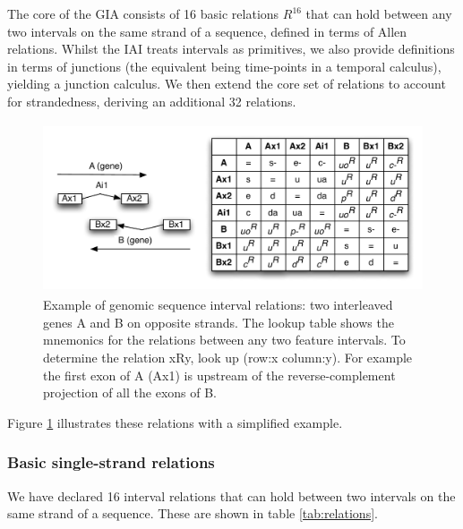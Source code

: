 \documentclass{article}
\begin{document}
The core of the GIA consists of 16 basic relations $R^{16}$ that can hold
between any two intervals on the same strand of a sequence, defined in
terms of Allen relations. Whilst the IAI treats intervals as
primitives, we also provide definitions in terms of junctions (the
equivalent being time-points in a temporal calculus), yielding a
junction calculus.  We then extend the core set of relations to
account for strandedness, deriving an additional 32 relations.

\begin{figure}
\center
\includegraphics[height=5cm]{relations-examples}
\caption{Example of genomic sequence interval relations: two
  interleaved genes A and B on opposite strands. The lookup table
  shows the mnemonics for the relations between any two feature
  intervals. To determine the relation xRy, look up (row:x
  column:y). For example the first exon of A (Ax1) is upstream of the
  reverse-complement projection of all the exons of B.}
\label{fig:relations-examples}
\end{figure}

Figure \ref{fig:relations-examples} illustrates these relations with a
simplified example.

\subsubsection{Basic single-strand relations}

We have declared 16 interval relations that can hold between two
intervals on the same strand of a sequence. These are shown in table
\ref{tab:relations}.
\end{document}
